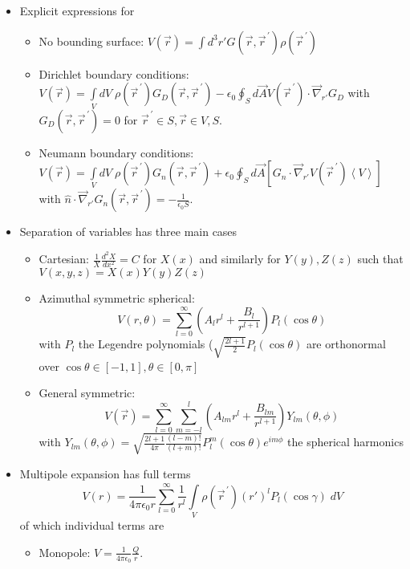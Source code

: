 \documentclass[10pt]{report}
\newcommand{\rtd}[2]{\frac{d^2#1}{d#2^2}}
\newcommand{\pvec}[1]{\vec{#1}^{\,\prime}}
\newcommand{\grad}[0]{\vec{\nabla}}
\newcommand{\expvalue}[1]{\left<#1\right>}
\begin{document}
\begin{itemize}
    \item Explicit expressions for
        \begin{itemize}
            \item No bounding surface: $V(\vec{r}) = \int d^3r' G(\vec{r}, \pvec{r}) \rho(\pvec{r})$
            \item Dirichlet boundary conditions: $V(\vec{r}) = \displaystyle\int\limits_{V}^{}dV\;\rho(\pvec{r})G_D(\vec{r}, \pvec{r}) - \epsilon_0\oint_S d\vec{A}V(\pvec{r})\cdot \grad_{r'} G_D$ with $G_D(\vec{r}, \pvec{r}) = 0$ for $\pvec{r} \in S, \vec{r} \in V,S$. 
            \item Neumann boundary conditions: $V(\vec{r}) = \displaystyle\int\limits_{V}^{}dV\;\rho(\pvec{r})G_n(\vec{r}, \pvec{r}) + \epsilon_0\oint_S d\vec{A}\left[ G_n\cdot \grad_{r'}V(\pvec{r}) \expvalue{V} \right]$ with $\hat{n}\cdot \vec{\nabla}_{r'} G_n(\vec{r}, \pvec{r}) = -\frac{1}{\epsilon_0S}$.
        \end{itemize}
    \item Separation of variables has three main cases
        \begin{itemize}
            \item Cartesian: $\frac{1}{X}\rtd{X}{x} = C$ for $X(x)$ and similarly for $Y(y), Z(z)$ such that $V(x,y,z) = X(x)Y(y)Z(z)$
            \item Azimuthal symmetric spherical: $$V(r,\theta) = \sum_{l=0}^{\infty}\left( A_lr^l + \frac{B_l}{r^{l+1}} \right)P_l(\cos\theta)$$ with $P_l$ the Legendre polynomials ($\sqrt{\frac{2l+1}{2}} P_l(\cos\theta)$ are orthonormal over $\cos\theta \in [-1,1], \theta\in[0,\pi]$
            \item General symmetric: $$V(\vec{r}) = \sum_{l=0}^{\infty}\sum_{m=-l}^{l}\left( A_{lm}r^l + \frac{B_{lm}}{r^{l+1}} \right)Y_{lm}(\theta,\phi)$$ with $Y_{lm}(\theta, \phi) = \sqrt{\frac{2l+1}{4\pi}\frac{(l-m)!}{(l+m)!}}P_l^m(\cos\theta)e^{im\phi}$ the spherical harmonics
        \end{itemize}
    \item Multipole expansion has full terms
        \begin{equation}
                V(r)= \frac{1}{4\pi\epsilon_0r}\sum_{l=0}^{\infty}\frac{1}{r^l}\displaystyle\int\limits_{V}^{}\rho(\pvec{r}) \left( r' \right)^lP_l(\cos \gamma)\;dV
        \end{equation} of which individual terms are
        \begin{itemize}
            \item Monopole: $V = \frac{1}{4\pi\epsilon_0}\frac{Q}{r}$.

\end{itemize}
\end{itemize}
\end{document}
